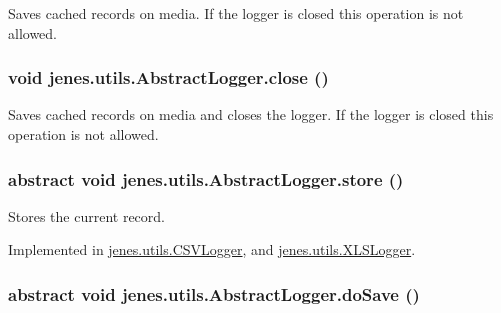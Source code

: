 Saves cached records on media. If the logger is closed this operation is not allowed. \hypertarget{classjenes_1_1utils_1_1_abstract_logger_7d973cbb6b91f254a5430a8875898dbe}{
\subsubsection[close]{\setlength{\rightskip}{0pt plus 5cm}void jenes.utils.AbstractLogger.close ()}}
\label{classjenes_1_1utils_1_1_abstract_logger_7d973cbb6b91f254a5430a8875898dbe}


Saves cached records on media and closes the logger. If the logger is closed this operation is not allowed. \hypertarget{classjenes_1_1utils_1_1_abstract_logger_6acf83a83999e26ae4ed45cbf355111b}{
\subsubsection[store]{\setlength{\rightskip}{0pt plus 5cm}abstract void jenes.utils.AbstractLogger.store ()}}
\label{classjenes_1_1utils_1_1_abstract_logger_6acf83a83999e26ae4ed45cbf355111b}


Stores the current record. 

Implemented in \hyperlink{classjenes_1_1utils_1_1_c_s_v_logger_863bcfda3e93b023949a81e7f6d149e7}{jenes.utils.CSVLogger}, and \hyperlink{classjenes_1_1utils_1_1_x_l_s_logger_e6b3840ad6be8bdc558efaf6077d4ae4}{jenes.utils.XLSLogger}.\hypertarget{classjenes_1_1utils_1_1_abstract_logger_41fcd50b050c467fe1b413fc5b49c167}{
\subsubsection[doSave]{\setlength{\rightskip}{0pt plus 5cm}abstract void jenes.utils.AbstractLogger.doSave ()}}
\label{classjenes_1_1utils_1_1_abstract_logger_41fcd50b050c467fe1b413fc5b49c167}


